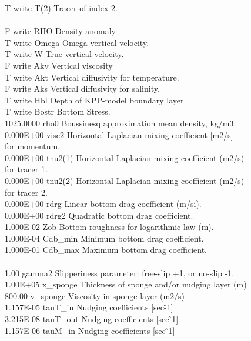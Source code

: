       T  write T(2)  Tracer of index 2.\\
\\
      F  write RHO   Density anomaly\\
      T  write Omega Omega vertical velocity.\\
      T  write W     True vertical velocity.\\
      F  write Akv   Vertical viscosity\\
      T  write Akt   Vertical diffusivity for temperature.\\
      F  write Aks   Vertical diffusivity for salinity.\\
      T  write Hbl   Depth of KPP-model boundary layer\\
      T  write Bostr Bottom Stress.\\
 1025.0000  rho0     Boussinesq approximation mean density, kg/m3.\\
 0.000E+00  visc2    Horizontal Laplacian mixing coefficient [m2/s]\\
                                for momentum.\\
 0.000E+00  tnu2(1)  Horizontal Laplacian mixing coefficient (m2/s)\\
                                for tracer 1.\\
 0.000E+00  tnu2(2)  Horizontal Laplacian mixing coefficient (m2/s)\\
                                for tracer 2.\\
 0.000E+00  rdrg     Linear bottom drag coefficient (m/si).\\
 0.000E+00  rdrg2    Quadratic bottom drag coefficient.\\
 1.000E-02  Zob      Bottom roughness for logarithmic law (m).\\
 1.000E-04  Cdb\_min  Minimum bottom drag coefficient.\\
 1.000E-01  Cdb\_max  Maximum bottom drag coefficient.\\
\\
      1.00  gamma2   Slipperiness parameter: free-slip +1, or no-slip -1.\\
  1.00E+05  x\_sponge Thickness of sponge and/or nudging layer (m)\\
    800.00  v\_sponge Viscosity in sponge layer (m2/s)\\
 1.157E-05  tauT\_in  Nudging coefficients [sec\^-1]\\
 3.215E-08  tauT\_out Nudging coefficients [sec\^-1]\\
 1.157E-06  tauM\_in  Nudging coefficients [sec\^-1]\\

